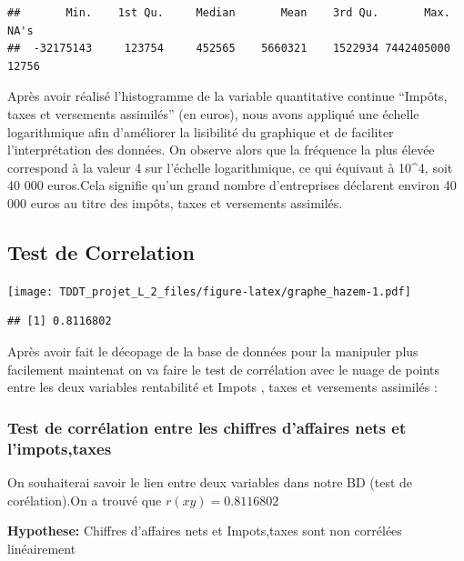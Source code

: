 \documentclass[mstat,12pt]{unswthesis}
\begin{document}
\begin{verbatim}
##       Min.    1st Qu.     Median       Mean    3rd Qu.       Max.       NA's 
##  -32175143     123754     452565    5660321    1522934 7442405000      12756
\end{verbatim}

\normalsize

Après avoir réalisé l'histogramme de la variable quantitative continue
``Impôts, taxes et versements assimilés'' (en euros), nous avons
appliqué une échelle logarithmique afin d'améliorer la lisibilité du
graphique et de faciliter l'interprétation des données. On observe alors
que la fréquence la plus élevée correspond à la valeur 4 sur l'échelle
logarithmique, ce qui équivaut à 10\^{}4, soit 40 000 euros.Cela
signifie qu'un grand nombre d'entreprises déclarent environ 40 000 euros
au titre des impôts, taxes et versements assimilés.

\subsection{Test de Correlation}\label{test-de-correlation}

\medskip

\texttt{[image: TDDT\_projet\_L\_2\_files/figure-latex/graphe\_hazem-1.pdf]}

\begin{verbatim}
## [1] 0.8116802
\end{verbatim}

\medskip

Après avoir fait le décopage de la base de données pour la manipuler
plus facilement maintenat on va faire le test de corrélation avec le
nuage de points entre les deux variables rentabilité et Impots , taxes
et versements assimilés :

\medskip

\subsubsection{Test de corrélation entre les chiffres d'affaires nets et
l'impots,taxes}\label{test-de-corruxe9lation-entre-les-chiffres-daffaires-nets-et-limpotstaxes}

\medskip

On souhaiterai savoir le lien entre deux variables dans notre BD (test
de corélation).On a trouvé que \(r(xy)=0.8116802\)

\medskip

\textbf{Hypothese:} Chiffres d'affaires nets et Impots,taxes sont non
corrélées linéairement
\end{document}
